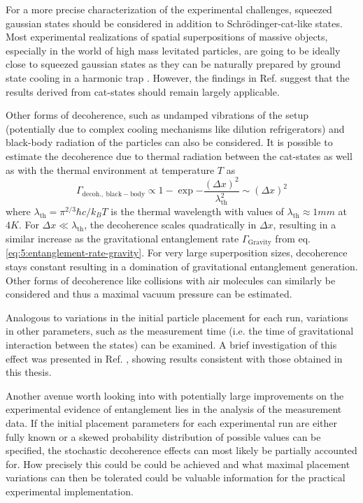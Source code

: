 For a more precise characterization of the experimental challenges, squeezed gaussian states \cite[p. 33-64]{Serafini_2017} should be considered in addition to Schrödinger-cat-like states.
Most experimental realizations of spatial superpositions of massive objects, especially in the world of high mass levitated particles, are going to be ideally close to squeezed gaussian states \cite[Timestamp: 23:00]{Aspelmeyer_2024} as they can be naturally prepared by ground state cooling in a harmonic trap \cite{Weiss_2021}.
However, the findings in Ref. \cite{Pedernales_2023} suggest that the results derived from cat-states should remain largely applicable.

Other forms of decoherence, such as undamped vibrations of the setup (potentially due to complex cooling mechanisms like dilution refrigerators) and black-body radiation of the particles can also be considered.
It is possible to estimate the decoherence due to thermal radiation \cite[p. 127-136]{Schlosshauer_2007} between the cat-states as well as with the thermal environment at temperature $T$ as \cite{RomeroIsart_2011}
\begin{equation}
  \Gamma_\mathrm{decoh.,\ black-body} \propto 1 - \exp{-\frac{(\Delta x)^2}{\lambda^2_\mathrm{th}}} \sim (\Delta x)^2
\end{equation}
where $\lambda_\mathrm{th} = \pi^{2/3} \hbar c / k_B T$ is the thermal wavelength with values of $\lambda_\mathrm{th} \approx 1\si{mm}$ at $4\si{K}$. 
For $\Delta x \ll \lambda_\mathrm{th}$, the decoherence scales quadratically in $\Delta x$, resulting in a similar increase as the gravitational entanglement rate $\Gamma_\mathrm{Gravity}$ from eq. \eqref{eq:5:entanglement-rate-gravity}.
For very large superposition sizes, decoherence stays constant resulting in a domination of gravitational entanglement generation.
Other forms of decoherence like collisions with air molecules can similarly be considered and thus a maximal vacuum pressure can be estimated.

Analogous to variations in the initial particle placement for each run, variations in other parameters, such as the measurement time (i.e. the time of gravitational interaction between the states) can be examined.
A brief investigation of this effect was presented in Ref. \cite{Nguyen_2020}, showing results consistent with those obtained in this thesis.

Another avenue worth looking into with potentially large improvements on the experimental evidence of entanglement lies in the analysis of the measurement data.
If the initial placement parameters for each experimental run are either fully known or a skewed probability distribution of possible values can be specified, the stochastic decoherence effects can most likely be partially accounted for.
How precisely this could be could be achieved and what maximal placement variations can then be tolerated could be valuable information for the practical experimental implementation.


